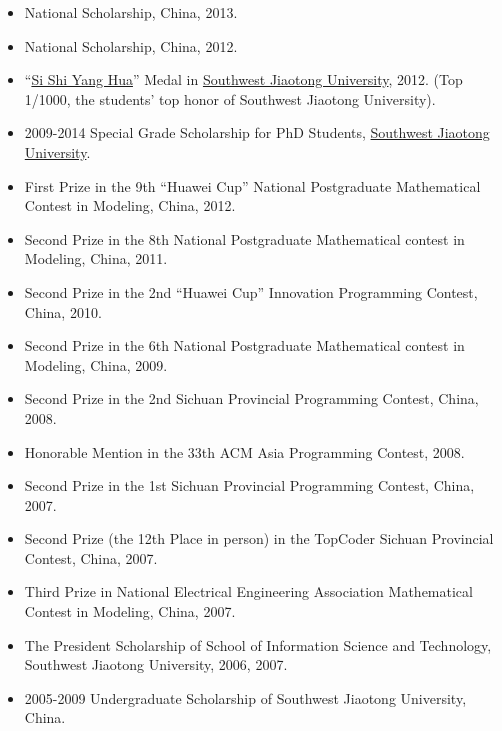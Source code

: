\documentclass[10pt,a4paper]{article}
\begin{document}
\begin{itemize}
\itemsep1pt\parskip0pt
\item
  National Scholarship, China, 2013.
\item
  National Scholarship, China, 2012.
\item
  ``\href{http://baike.baidu.com/view/644025.htm}{Si Shi Yang Hua}''
  Medal in \href{http://www.swjtu.edu.cn/}{Southwest Jiaotong
  University}, 2012. (Top 1/1000, the students' top honor of Southwest
  Jiaotong University).
\item
  2009-2014 Special Grade Scholarship for PhD Students,
  \href{http://www.swjtu.edu.cn/}{Southwest Jiaotong University}.
\item
  First Prize in the 9th ``Huawei Cup'' National Postgraduate
  Mathematical Contest in Modeling, China, 2012.
\item
  Second Prize in the 8th National Postgraduate Mathematical contest in
  Modeling, China, 2011.
\item
  Second Prize in the 2nd ``Huawei Cup'' Innovation Programming Contest,
  China, 2010.
\item
  Second Prize in the 6th National Postgraduate Mathematical contest in
  Modeling, China, 2009.
\item
  Second Prize in the 2nd Sichuan Provincial Programming Contest, China,
  2008.
\item
  Honorable Mention in the 33th ACM Asia Programming Contest, 2008.
\item
  Second Prize in the 1st Sichuan Provincial Programming Contest, China,
  2007.
\item
  Second Prize (the 12th Place in person) in the TopCoder Sichuan
  Provincial Contest, China, 2007.
\item
  Third Prize in National Electrical Engineering Association
  Mathematical Contest in Modeling, China, 2007.
\item
  The President Scholarship of School of Information Science and
  Technology, Southwest Jiaotong University, 2006, 2007.
\item
  2005-2009 Undergraduate Scholarship of Southwest Jiaotong University,
  China.
\end{itemize}
\end{document}
